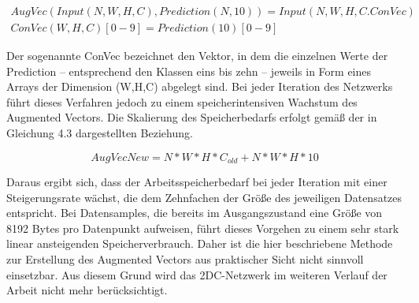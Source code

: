 \begin{multline}
    AugVec(Input(N, W, H, C), Prediction(N, 10)) = Input(N, W, H, C.ConVec)\\
    ConVec(W, H, C)[0-9] = Prediction(10)[0-9]
\end{multline}

Der sogenannte ConVec bezeichnet den Vektor, in dem die einzelnen Werte der Prediction – entsprechend den Klassen eins bis zehn – jeweils in 
Form eines Arrays der Dimension (W,H,C) abgelegt sind. Bei jeder Iteration des Netzwerks führt dieses Verfahren jedoch zu einem 
speicherintensiven Wachstum des Augmented Vectors. Die Skalierung des Speicherbedarfs erfolgt gemäß der in Gleichung 4.3 dargestellten Beziehung.

\begin{equation}
    AugVecNew = N*W*H*C_{old} + N*W*H*10
\end{equation}

Daraus ergibt sich, dass der Arbeitsspeicherbedarf bei jeder Iteration mit einer Steigerungsrate wächst, die dem Zehnfachen der Größe des 
jeweiligen Datensatzes entspricht. Bei Datensamples, die bereits im Ausgangszustand eine Größe von 8192 Bytes pro Datenpunkt aufweisen, führt 
dieses Vorgehen zu einem sehr stark linear ansteigenden Speicherverbrauch. Daher ist die hier beschriebene Methode zur Erstellung des Augmented Vectors aus 
praktischer Sicht nicht sinnvoll einsetzbar. Aus diesem Grund wird das 2DC-Netzwerk im weiteren Verlauf der Arbeit nicht mehr berücksichtigt.
